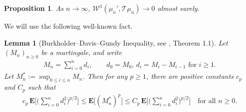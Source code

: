 \documentclass[11pt,reqno]{amsart}
\numberwithin{equation}{section}
\newtheorem{prop}[thm]{Proposition}
\newtheorem{lemma}[thm]{Lemma}
\theoremstyle{definition}
\begin{document}
\begin{prop} \label{primeT_as}
As $n \to \infty$, $\mathcal{W}^1(\mu_n',{\mathcal{T}}\mu_n) \to 0$ almost surely.
\end{prop}

We will use the following well-known fact.

\begin{lemma}[Burkholder--Davis--Gundy Inequality, see \cite{burkholder-davis-gundy72}, Theorem 1.1]
\label{bdg}
Let $(M_n)_{n \geq 0}$ be a martingale, and write
{\begin{align*} {
M_n = \sum_{i = 0}^n d_i, \qquad \text{$d_0 = M_0$, $d_i = M_{i}-M_{i-1}$ for $i \geq 1$}.
} \end{align*}}
Let $M_n^* := \sup_{0 \leq i \leq n} M_n$.
Then for any $p \geq 1$, there are positive constants $c_p$ and $C_p$ such that
{\begin{align*} {
c_p\, {\mathbf{E}}\Bigg[\bigg(\sum_{i = 0}^n d_i^2\bigg)^{p/2}\Bigg]
\leq {\mathbf{E}}\big[(M_n^*)^p\big]
\leq C_p\, {\mathbf{E}}\Bigg[\bigg(\sum_{i = 0}^n d_i^2\bigg)^{p/2}\Bigg] \quad \text{for all $n \geq 0$.}
} \end{align*}}
\end{lemma}
\end{document}
